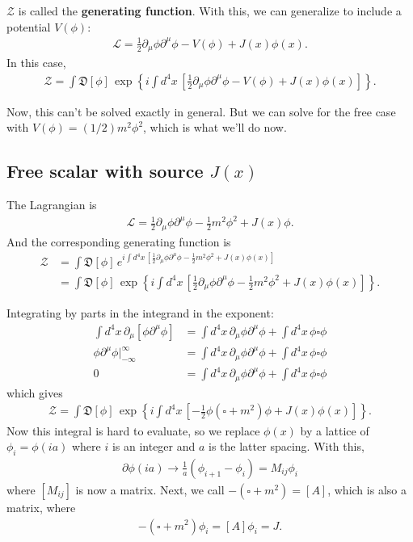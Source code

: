 \documentclass{book}
\theoremstyle{definition}
\newcommand{\p}{\partial}
\newcommand{\lag}{\mathcal{L}}
\newcommand{\f}[2]{\frac{#1}{#2}}
\newcommand{\lb}{\left[}
\newcommand{\rb}{\right]}
\newcommand{\lc}{\left\{}
\newcommand{\rc}{\right\}}
\newcommand{\Z}{\mathcal{Z}}
\begin{document}
$\Z$ is called the \textbf{generating function}. With this, we can generalize to include a potential $V(\phi)$:
\begin{align}
\lag = \f{1}{2}\p_\mu \phi \p^\mu \phi - V(\phi) + J(x)\phi(x).
\end{align}
In this case,
\begin{align}
\boxed{\Z = \int \mathfrak{D}[\phi]\, \exp\lc i\int d^4x\, \lb \f{1}{2}\p_\mu \phi \p^\mu \phi - V(\phi) + J(x)\phi(x) \rb\rc}.
\end{align}

Now, this can't be solved exactly in general. But we can solve for the free case with $V(\phi) = (1/2)m^2\phi^2$, which is what we'll do now.


\newpage

\subsection{Free scalar with source $J(x)$}

The Lagrangian is 
\begin{align}
\lag = \f{1}{2}\p_\mu \phi \p^\mu \phi - \f{1}{2}m^2\phi^2 + J(x)\phi.
\end{align}
And the corresponding generating function is
\begin{align}
\Z &= \int \mathfrak{D}[\phi]\, e^{i\int d^4x\, \lb \f{1}{2}\p_\mu \phi \p^\mu \phi - \f{1}{2}m^2\phi^2 + J(x)\phi(x) \rb}\\
&= \int \mathfrak{D}[\phi]\, \exp\lc i\int d^4x\, \lb \f{1}{2}\p_\mu \phi \p^\mu \phi - \f{1}{2}m^2\phi^2 + J(x)\phi(x) \rb \rc.
\end{align}


Integrating by parts in the integrand in the exponent:
\begin{align}
\int d^4x\,\p_\mu \lb \phi \p^\mu \phi \rb &= \int d^4x\, \p_\mu \phi \p^\mu \phi   + \int d^4x\, \phi \square \phi \\ 
\phi\p^\mu\phi\bigg\vert^\infty_{-\infty} &= \int d^4x\, \p_\mu \phi \p^\mu \phi   + \int d^4x\, \phi \square \phi  \\ 
0 &= \int d^4x\, \p_\mu \phi \p^\mu \phi   + \int d^4x\, \phi \square \phi
\end{align}
which gives
\begin{align}
\Z = \int \mathfrak{D}[\phi]\, \exp\lc i\int d^4x\, \lb -\f{1}{2}\phi(\square + m^2) \phi  + J(x)\phi(x) \rb\rc.
\end{align}
Now this integral is hard to evaluate, so we replace $\phi(x)$ by a lattice of $\phi_i = \phi(ia)$ where $i$ is an integer and $a$ is the latter spacing. With this,
\begin{align}
\p \phi(ia) \to \f{1}{a}(\phi_{i+1} - \phi_i) = M_{ij}\phi_i
\end{align}
where $[M_{ij}]$ is now a matrix. Next, we call $-(\square + m^2) = [A]$, which is also a matrix, where
\begin{align}
-(\square + m^2)\phi_i = [A]\phi_i = J.
\end{align}
\end{document}
